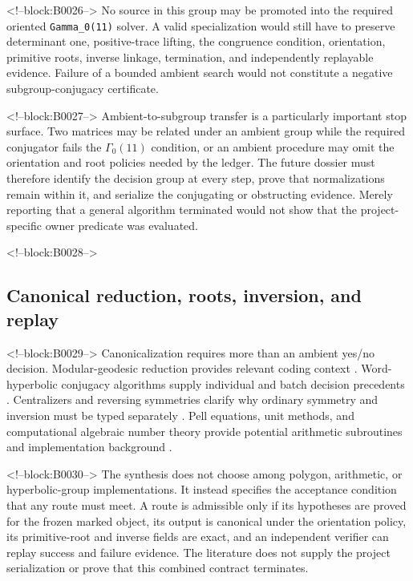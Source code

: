 \documentclass[11pt]{article}
\begin{document}
<!--block:B0026-->
No source in this group may be promoted into the required oriented
\texttt{Gamma\_0(11)} solver. A valid specialization would still have to
preserve determinant one, positive-trace lifting, the congruence
condition, orientation, primitive roots, inverse linkage, termination,
and independently replayable evidence. Failure of a bounded ambient
search would not constitute a negative subgroup-conjugacy certificate.

<!--block:B0027-->
Ambient-to-subgroup transfer is a particularly important stop surface.
Two matrices may be related under an ambient group while the required
conjugator fails the $\Gamma_0(11)$ condition, or an ambient procedure
may omit the orientation and root policies needed by the ledger. The
future dossier must therefore identify the decision group at every
step, prove that normalizations remain within it, and serialize the
conjugating or obstructing evidence. Merely reporting that a general
algorithm terminated would not show that the project-specific owner
predicate was evaluated.

<!--block:B0028-->
\hypertarget{23-canonical-reduction-roots-inversion-and-replay}{%
\subsection{Canonical reduction, roots, inversion, and
replay}\label{23-canonical-reduction-roots-inversion-and-replay}}

<!--block:B0029-->
Canonicalization requires more than an ambient yes/no decision.
Modular-geodesic reduction provides relevant coding context
\citep{P31-S15}.
Word-hyperbolic conjugacy algorithms supply individual and batch decision
precedents
\citep{P31-S16,P31-S17}.
Centralizers and reversing symmetries clarify why ordinary symmetry and
inversion must be typed separately
\citep{P31-S18}.
Pell equations, unit methods, and computational algebraic number theory
provide potential arithmetic subroutines and implementation background
\citep{P31-S19,P31-S20}.

<!--block:B0030-->
The synthesis does not choose among polygon, arithmetic, or
hyperbolic-group implementations. It instead specifies the acceptance
condition that any route must meet. A route is admissible only if its
hypotheses are proved for the frozen marked object, its output is
canonical under the orientation policy, its primitive-root and inverse
fields are exact, and an independent verifier can replay success and
failure evidence. The literature does not supply the project
serialization or prove that this combined contract terminates.
\end{document}
